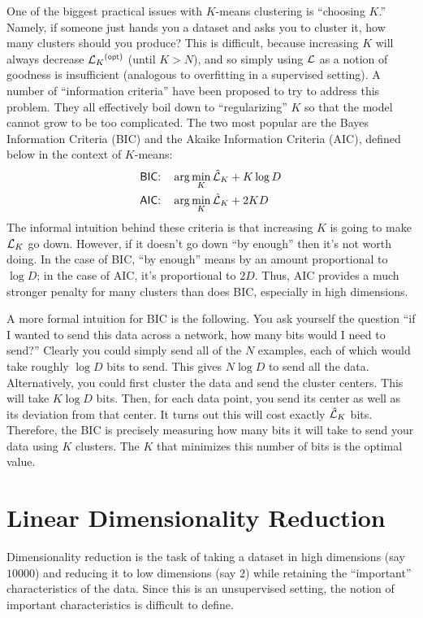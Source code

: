 One of the biggest practical issues with $K$-means clustering is
``choosing $K$.''  Namely, if someone just hands you a dataset and
asks you to cluster it, how many clusters should you produce?  This is
difficult, because increasing $K$ will always decrease
$\cL_K\xth{opt}$ (until $K > N$), and so simply using $\mathcal{L}$ as a
notion of goodness is insufficient (analogous to overfitting in a
supervised setting).  A number of ``information criteria'' have been
proposed to try to address this problem.  They all effectively boil
down to ``regularizing'' $K$ so that the model cannot grow to be too
complicated.  The two most popular are the Bayes Information Criteria
(BIC) and the Akaike Information Criteria (AIC), defined below in the
context of $K$-means:
%
\begin{align}
\textsf{BIC:}\quad & \arg\min_K \hat{\mathcal{L}}_K + K \log D \\
\textsf{AIC:}\quad & \arg\min_K \hat{\mathcal{L}}_K + 2 K D
\end{align}
%
The informal intuition behind these criteria is that increasing $K$ is
going to make $\mathcal{L}_K$ go down.  However, if it doesn't go down ``by
enough'' then it's not worth doing.  In the case of BIC, ``by enough''
means by an amount proportional to $\log D$; in the case of AIC, it's
proportional to $2D$.  Thus, AIC provides a much stronger penalty for
many clusters than does BIC, especially in high dimensions.

A more formal intuition for BIC is the following.  You ask yourself
the question ``if I wanted to send this data across a network, how
many bits would I need to send?''  Clearly you could simply send all
of the $N$ examples, each of which would take roughly $\log D$ bits to
send.  This gives $N \log D$ to send all the data.  Alternatively, you
could first cluster the data and send the cluster centers.  This will
take $K \log D$ bits.  Then, for each data point, you send its center
as well as its deviation from that center.  It turns out this will
cost exactly $\hat{\mathcal{L}}_K$ bits.  Therefore, the BIC is precisely
measuring how many bits it will take to send your data using $K$
clusters.  The $K$ that minimizes this number of bits is the optimal
value.


\section{Linear Dimensionality Reduction}

Dimensionality reduction is the task of taking a dataset in high
dimensions (say $10000$) and reducing it to low dimensions (say $2$)
while retaining the ``important'' characteristics of the data.  Since
this is an unsupervised setting, the notion of important
characteristics is difficult to define.

